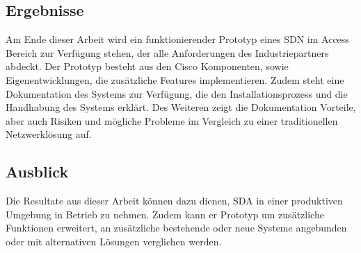 \subsection{Ergebnisse}
Am Ende dieser Arbeit wird ein funktionierender Prototyp eines SDN im Access Bereich zur Verfügung stehen, der alle Anforderungen des Industriepartners abdeckt. Der Prototyp besteht aus den Cisco Komponenten, sowie Eigenentwicklungen, die zusätzliche Features implementieren. 
Zudem steht eine Dokumentation des Systems zur Verfügung, die den Installationsprozess und die Handhabung des Systems erklärt. Des Weiteren zeigt die Dokumentation Vorteile, aber auch Risiken und mögliche Probleme im Vergleich zu einer traditionellen Netzwerklösung auf.
\subsection{Ausblick}
Die Resultate aus dieser Arbeit können dazu dienen, SDA in einer produktiven Umgebung in Betrieb zu nehmen. Zudem kann er Prototyp um zusätzliche Funktionen erweitert, an zusätzliche bestehende oder neue Systeme angebunden oder mit alternativen Lösungen verglichen werden.
